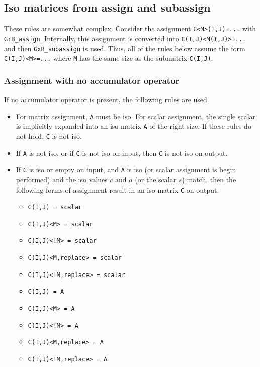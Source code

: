 \documentclass[12pt]{article}
\begin{document}
{%
\subsection{Iso matrices from assign and subassign}
\label{iso_assign}

These rules are somewhat complex.  Consider the assignment \verb'C<M>(I,J)=...'
with \verb'GrB_assign'.  Internally, this assignment is converted into
\verb'C(I,J)<M(I,J)>=...' and then \verb'GxB_subassign' is used.  Thus,
all of the rules below assume the form \verb'C(I,J)<M>=...' where \verb'M'
has the same size as the submatrix \verb'C(I,J)'.

\subsubsection{Assignment with no accumulator operator}

If no accumulator operator is present, the following rules are used.

\begin{itemize}
\item 
For matrix assignment, \verb'A' must be iso.  For scalar assignment, the single
scalar is implicitly expanded into an iso matrix \verb'A' of the right size.
If these rules do not hold, \verb'C' is not iso.

\item
If \verb'A' is not iso, or if \verb'C' is not iso on input, then \verb'C' is
not iso on output.

\item
If \verb'C' is iso or empty on input, and \verb'A' is iso (or scalar assignment
is begin performed) and the iso values $c$ and $a$ (or the scalar $s$) match,
then the following forms of assignment result in an iso matrix \verb'C'  on
output:

                \begin{itemize}
                \item \verb'C(I,J) = scalar'
                \item \verb'C(I,J)<M> = scalar'
                \item \verb'C(I,J)<!M> = scalar'
                \item \verb'C(I,J)<M,replace> = scalar'
                \item \verb'C(I,J)<!M,replace> = scalar'
                \item \verb'C(I,J) = A'
                \item \verb'C(I,J)<M> = A'
                \item \verb'C(I,J)<!M> = A'
                \item \verb'C(I,J)<M,replace> = A'
                \item \verb'C(I,J)<!M,replace> = A'
                \end{itemize}


\end{itemize}}
\end{document}
